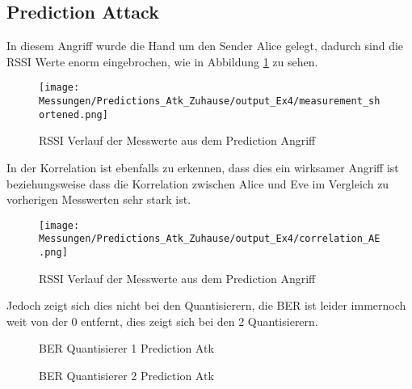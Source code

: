 \documentclass[12pt,a4paper]{article}
\begin{document}
\subsection*{Prediction Attack}
In diesem Angriff wurde die Hand um den Sender Alice gelegt, dadurch sind die RSSI Werte enorm eingebrochen, wie in Abbildung \ref{fig:p1} zu sehen.
\begin{figure}[H]
\centering
\texttt{[image: Messungen/Predictions\_Atk\_Zuhause/output\_Ex4/measurement\_shortened.png]}
\caption{RSSI Verlauf der Messwerte aus dem Prediction Angriff}
\label{fig:p1}
\end{figure}
In der Korrelation ist ebenfalls zu erkennen, dass dies ein wirksamer Angriff ist beziehungsweise dass die Korrelation zwischen Alice und Eve im Vergleich zu vorherigen Messwerten sehr stark ist.
\begin{figure}[H]
\centering
\texttt{[image: Messungen/Predictions\_Atk\_Zuhause/output\_Ex4/correlation\_AE.png]}
\caption{RSSI Verlauf der Messwerte aus dem Prediction Angriff}
\label{fig:p2}
\end{figure}
Jedoch zeigt sich dies nicht bei den Quantisierern, die BER ist leider immernoch weit von der 0 entfernt, dies zeigt sich bei den 2 Quantisierern.
\begin{figure}[H]
\centering
{} \qquad
{}
\caption{BER Quantisierer 1 Prediction Atk}
\label{fig:p3}
\end{figure}
\begin{figure}[H]
\centering
{} \qquad
{}
\caption{BER Quantisierer 2 Prediction Atk}
\label{fig:p4}
\end{figure}
\end{document}
